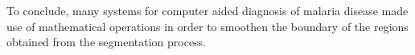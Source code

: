 \documentclass[sensors,review,submit,moreauthors,pdftex,10pt,a4paper]{mdpi}
\begin{document}

To conclude, many systems for computer aided diagnosis of malaria disease made use of mathematical operations in order to smoothen the boundary of the regions obtained from the segmentation process.



%
\end{document}
